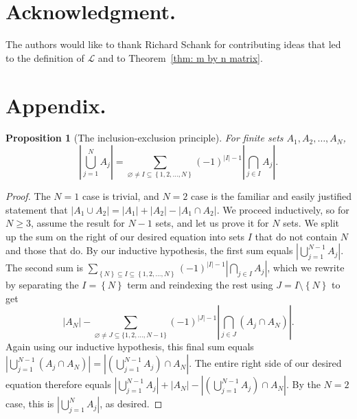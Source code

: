 \documentclass[12pt]{article}
\theoremstyle{plain}
\providecommand{\propositionname}{Proposition}
\newtheorem*{prop*}{\protect\propositionname}
\theoremstyle{remark}
\theoremstyle{definition}
\theoremstyle{remark}
\theoremstyle{definition}
\begin{document}
\section*{Acknowledgment.}

The authors would like to thank Richard Schank for contributing ideas that led to the definition of $\mathscr{L}$ and to Theorem~\ref{thm: m by n matrix}.


\printbibliography


\section{Appendix.}

\begin{prop*}[The inclusion-exclusion principle]
 For finite sets $A_{1},A_{2},\dots,A_{N}$, 
\[
\left|\bigcup_{j=1}^{N}A_{j}\right|=\sum_{\varnothing\neq I\subseteq\left\{ 1,2,\dots,N\right\} }\left(-1\right)^{\left|I\right|-1}\left|\bigcap_{j\in I}A_{j}\right|.
\]
\end{prop*}
\begin{proof}
The $N=1$ case is trivial, and $N=2$ case is the familiar and easily justified statement that $\left|A_{1}\cup A_{2}\right|=\left|A_{1}\right|+\left|A_{2}\right|-\left|A_{1}\cap A_{2}\right|$. We proceed inductively, so for $N\ge3$, assume the result for $N-1$ sets, and let us prove it for $N$ sets. We split up the sum on the right of our desired equation into sets $I$ that do not contain $N$ and those that do. By our inductive hypothesis, the first sum equals $\left|\bigcup_{j=1}^{N-1}A_{j}\right|$. The second sum is $\sum_{\left\{ N\right\} \subseteq I\subseteq\left\{ 1,2,\dots,N\right\} }\left(-1\right)^{\left|I\right|-1}\left|\bigcap_{j\in I}A_{j}\right|$, which we rewrite by separating the $I=\left\{ N\right\} $ term and reindexing the rest using $J=I\setminus\left\{ N\right\} $ to get
\[
\left|A_{N}\right|-\sum_{\varnothing\neq J\subseteq\{1,2,\dots,N-1\}}\left(-1\right)^{\left|J\right|-1}\left|\bigcap_{j\in J}\left(A_{j}\cap A_{N}\right)\right|.
\]
Again using our inductive hypothesis, this final sum equals $\left|\bigcup_{j=1}^{N-1}\left(A_{j}\cap A_{N}\right)\right|=\left|\left(\bigcup_{j=1}^{N-1}A_{j}\right)\cap A_{N}\right|.$ The entire right side of our desired equation therefore equals $\left|\bigcup_{j=1}^{N-1}A_{j}\right|+|A_{N}|-\left|\left(\bigcup_{j=1}^{N-1}A_{j}\right)\cap A_{N}\right|.$ By the $N=2$ case, this is $\left|\bigcup_{j=1}^{N}A_{j}\right|$, as desired. 
\end{proof}
\end{document}
